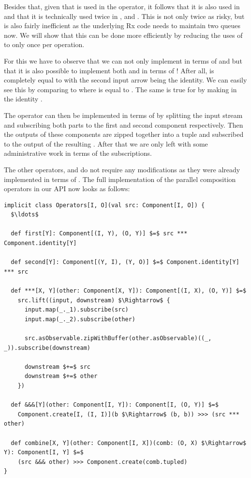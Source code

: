 Besides that, given that  is used in the  operator, it follows that it is also used in  and that it is technically used twice in \code{(***)}, \code{(\&\&\&)} and . This is not only twice as risky, but is also fairly inefficient as the underlying Rx code needs to maintain two queues now. We will show that this can be done more efficiently by reducing the uses of  to only once per  operation.

For this we have to observe that we can not only implement \code{(***)} in terms of  and  but that it is also possible to implement both  and  in terms of \code{(***)}! After all,  is completely equal to \code{(***)} with the second input arrow being the identity. We can easily see this by comparing  to  where  is equal to . The same is true for  by making  in  the identity \comp.

The \code{(***)} operator can then be implemented in terms of  by splitting the input stream and subscribing both parts to the first and second component respectively. Then the outputs of these components are zipped together into a tuple and subscribed to the output of the resulting \comp. After that we are only left with some administrative work in terms of the subscriptions.

The other operators, \code{(\&\&\&)} and  do not require any modifications as they were already implemented in terms of \code{(***)}. The full implementation of the parallel composition operators in our API now looks as follows:

\begin{minipage}{\linewidth}
\begin{lstlisting}[style=ScalaStyle, caption={New implementation of the \textit{Arrow}'s operators}, label={lst:new-arrow-implementation}]
implicit class Operators[I, O](val src: Component[I, O]) {
  $\ldots$

  def first[Y]: Component[(I, Y), (O, Y)] $=$ src *** Component.identity[Y]

  def second[Y]: Component[(Y, I), (Y, O)] $=$ Component.identity[Y] *** src

  def ***[X, Y](other: Component[X, Y]): Component[(I, X), (O, Y)] $=$
    src.lift((input, downstream) $\Rightarrow$ {
      input.map(_._1).subscribe(src)
      input.map(_._2).subscribe(other)

      src.asObservable.zipWithBuffer(other.asObservable)((_, _)).subscribe(downstream)

      downstream $+=$ src
      downstream $+=$ other
    })

  def &&&[Y](other: Component[I, Y]): Component[I, (O, Y)] $=$
    Component.create[I, (I, I)](b $\Rightarrow$ (b, b)) >>> (src *** other)

  def combine[X, Y](other: Component[I, X])(comb: (O, X) $\Rightarrow$ Y): Component[I, Y] $=$
    (src &&& other) >>> Component.create(comb.tupled)
}
\end{lstlisting}
\end{minipage}

